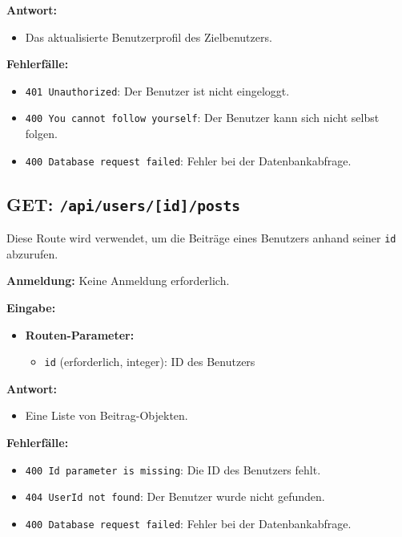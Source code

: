 \documentclass[a4paper,12pt]{article}
\begin{document}
\textbf{Antwort:}
\begin{itemize}
    \item Das aktualisierte Benutzerprofil des Zielbenutzers.
\end{itemize}

\textbf{Fehlerfälle:}
\begin{itemize}
    \item \texttt{401 Unauthorized}: Der Benutzer ist nicht eingeloggt.
    \item \texttt{400 You cannot follow yourself}: Der Benutzer kann sich nicht selbst folgen.
    \item \texttt{400 Database request failed}: Fehler bei der Datenbankabfrage.
\end{itemize}

\subsection{GET: \texttt{/api/users/[id]/posts}}

Diese Route wird verwendet, um die Beiträge eines Benutzers anhand seiner \texttt{id} abzurufen.

\textbf{Anmeldung:} Keine Anmeldung erforderlich.

\textbf{Eingabe:}
\begin{itemize}
    \item \textbf{Routen-Parameter:}
    \begin{itemize}
        \item \texttt{id} (erforderlich, integer): ID des Benutzers
    \end{itemize}
\end{itemize}

\textbf{Antwort:}
\begin{itemize}
    \item Eine Liste von Beitrag-Objekten.
\end{itemize}

\textbf{Fehlerfälle:}
\begin{itemize}
    \item \texttt{400 Id parameter is missing}: Die ID des Benutzers fehlt.
    \item \texttt{404 UserId not found}: Der Benutzer wurde nicht gefunden.
    \item \texttt{400 Database request failed}: Fehler bei der Datenbankabfrage.
\end{itemize}


\newpage
\end{document}
